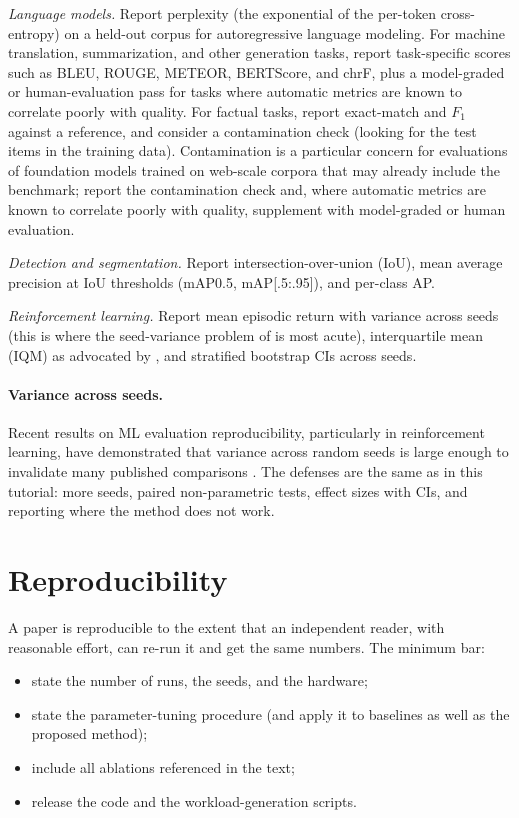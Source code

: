 \documentclass[11pt]{article}
\begin{document}
\textit{Language models.} Report perplexity (the exponential of the per-token cross-entropy) on a held-out corpus for autoregressive language modeling. For machine translation, summarization, and other generation tasks, report task-specific scores such as BLEU, ROUGE, METEOR, BERTScore, and chrF, plus a model-graded or human-evaluation pass for tasks where automatic metrics are known to correlate poorly with quality. For factual tasks, report exact-match and $F_1$ against a reference, and consider a contamination check (looking for the test items in the training data). Contamination is a particular concern for evaluations of foundation models trained on web-scale corpora that may already include the benchmark; report the contamination check and, where automatic metrics are known to correlate poorly with quality, supplement with model-graded or human evaluation.

\textit{Detection and segmentation.} Report intersection-over-union (IoU), mean average precision at IoU thresholds (mAP\@0.5, mAP\@[.5:.95]), and per-class AP.

\textit{Reinforcement learning.} Report mean episodic return with variance across seeds (this is where the seed-variance problem of \citet{henderson2018deep,agarwal2021precipice} is most acute), interquartile mean (IQM) as advocated by \citet{agarwal2021precipice}, and stratified bootstrap CIs across seeds.

\paragraph{Variance across seeds.} Recent results on ML evaluation reproducibility, particularly in reinforcement learning, have demonstrated that variance across random seeds is large enough to invalidate many published comparisons \citep{henderson2018deep,agarwal2021precipice}. The defenses are the same as in this tutorial: more seeds, paired non-parametric tests, effect sizes with CIs, and reporting where the method does not work.

\section{Reproducibility}
\label{sec:reproducibility}

A paper is reproducible to the extent that an independent reader, with reasonable effort, can re-run it and get the same numbers. The minimum bar:

\begin{itemize}
    \item state the number of runs, the seeds, and the hardware;
    \item state the parameter-tuning procedure (and apply it to baselines as well as the proposed method);
    \item include all ablations referenced in the text;
    \item release the code and the workload-generation scripts.
\end{itemize}
\end{document}
